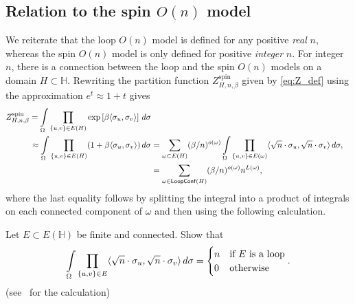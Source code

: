 \documentclass[12pt,reqno]{article}
\newcommand{\HH}{\mathbb{H}}
\newcommand{\LC}{\mathsf{LoopConf}}
\begin{document}
\subsection{Relation to the spin $O(n)$ model}
\label{sec:loop-spin-relation}

We reiterate that the loop $O(n)$ model is defined for any positive \emph{real}
$n$, whereas the spin $O(n)$ model is only defined for positive \emph{integer} $n$. For integer $n$, there is a connection between the
loop and the spin $O(n)$ models on a domain $H
\subset \HH$. Rewriting the partition function
$Z^{\text{spin}}_{H,n,\beta}$ given by \eqref{eq:Z_def} using the
approximation $e^t \approx 1+t$ gives
\[
\begin{split}
Z^{\text{spin}}_{H,n,\beta} =\int\displaylimits_{\Omega} \prod_{\{u,v\}\in E(H)} \exp \left[\beta \langle  \sigma_u,\sigma_v \rangle \right] \,d\sigma
\\\approx \int\displaylimits_{\Omega} \prod_{\{u,v\}\in E(H)} (1 + \beta \langle  \sigma_u,\sigma_v \rangle) \,d\sigma &= \sum_{\omega \subset E(H)} (\beta/n)^{o(\omega)} \int\displaylimits_{\Omega} \prod_{\{u,v\} \in E(\omega)} \langle \sqrt{n} \cdot \sigma_u, \sqrt{n} \cdot \sigma_v \rangle \,d\sigma,\\
& = \sum_{\omega \in \LC(H)} (\beta/n)^{o(\omega)} n^{L(\omega)},
\end{split}
\]
where the last equality follows by splitting the integral into a product of integrals on each connected component of $\omega$ and then using the following calculation.

\medbreak
{}
Let $E \subset E(\HH)$ be finite and connected. Show that
\[ \int\displaylimits_{\Omega} \prod_{\{u,v\} \in E} \langle \sqrt{n} \cdot \sigma_u, \sqrt{n} \cdot \sigma_v \rangle \,d\sigma = \begin{cases}n&\text{if $E$ is a loop}\\0&\text{otherwise}\end{cases} .\]
(see~\cite[Appendix A]{DCPSS14} for the calculation) \medbreak
\end{document}
